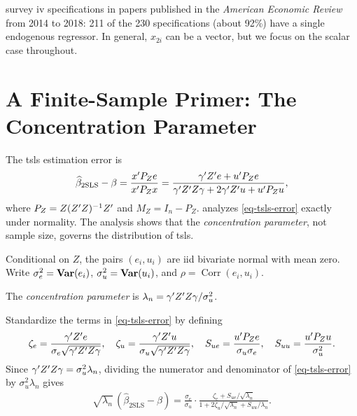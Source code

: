 \documentclass[a4paper,12pt]{article}
\begin{document}
\begin{remark}
	\textcite{andrews-stock-sun-2019} survey \gls{iv} specifications in papers published in the \emph{American Economic Review} from 2014 to 2018:
	211 of the 230 specifications (about 92\%) have a single endogenous regressor.
	In general, $x_{2i}$ can be a vector, but we focus on the scalar case throughout.
\end{remark}

\section{A Finite-Sample Primer: The Concentration Parameter}

The \gls{tsls} estimation error is
\begin{align}\label{eq-tsls-error}
	\widehat\beta_{\mathrm{2SLS}}-\beta
	=\frac{x^{\prime} P_Ze}{x^{\prime} P_Zx}
	=\frac{\gamma^{\prime} Z^{\prime} e+u^{\prime} P_Ze}{\gamma^{\prime} Z^{\prime} Z\gamma+2\gamma^{\prime} Z^{\prime} u+u^{\prime} P_Zu},
\end{align}
where $P_Z=Z(Z^{\prime} Z)^{-1} Z^{\prime}$ and $M_Z=I_n-P_Z$.
\textcite{rothenberg-1984} analyzes \eqref{eq-tsls-error} exactly under normality.
The analysis shows that the \emph{concentration parameter}, not sample size, governs the distribution of \gls{tsls}.

\begin{assumption}\label{ass-gaussian}
	Conditional on $Z$, the pairs $(e_i,u_i)$ are \gls{iid} bivariate normal with mean zero.
	Write $\sigma_e^2=\operatorname{\text{\textrm{\upshape\textbf{Var}}}}(e_i)$, $\sigma_u^2=\operatorname{\text{\textrm{\upshape\textbf{Var}}}}(u_i)$, and $\rho=\operatorname{Corr}(e_i,u_i)$.
\end{assumption}

\begin{definition}
	The \emph{concentration parameter} is
	$\lambda_n={\gamma^{\prime} Z^{\prime} Z\gamma}/{\sigma_u^2}$.
\end{definition}

Standardize the terms in \eqref{eq-tsls-error} by defining
\begin{align*}
	\zeta_e=\frac{\gamma^{\prime} Z^{\prime} e}{\sigma_e\sqrt{\gamma^{\prime} Z^{\prime} Z\gamma}},\quad
	\zeta_u=\frac{\gamma^{\prime} Z^{\prime} u}{\sigma_u\sqrt{\gamma^{\prime} Z^{\prime} Z\gamma}},\quad
	S_{ue}=\frac{u^{\prime} P_Ze}{\sigma_u\sigma_e},\quad
	S_{uu}=\frac{u^{\prime} P_Zu}{\sigma_u^2}.
\end{align*}
Since $\gamma^{\prime} Z^{\prime} Z\gamma=\sigma_u^2\lambda_n$, dividing the numerator and denominator of \eqref{eq-tsls-error}
by $\sigma_u^2\lambda_n$ gives
\begin{align}\label{eq-rothenberg}
	\sqrt{\lambda_n}\,(\widehat\beta_{\mathrm{2SLS}}-\beta)
	=\frac{\sigma_e}{\sigma_u}\cdot
	\frac{\zeta_e+S_{ue}/\sqrt{\lambda_n}}{1+2\zeta_u/\sqrt{\lambda_n}+S_{uu}/\lambda_n}.
\end{align}
\end{document}
